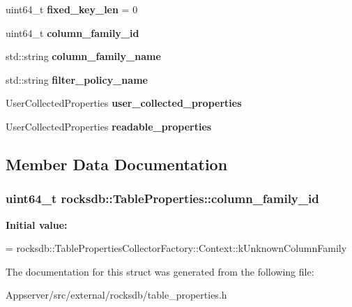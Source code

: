 \begin{DoxyCompactItemize}
\item 
uint64\+\_\+t {\bfseries fixed\+\_\+key\+\_\+len} = 0\hypertarget{structrocksdb_1_1TableProperties_a89dd7cb7e24a68b610d594355db1e2ff}{}\label{structrocksdb_1_1TableProperties_a89dd7cb7e24a68b610d594355db1e2ff}

\item 
uint64\+\_\+t {\bfseries column\+\_\+family\+\_\+id}
\item 
std\+::string {\bfseries column\+\_\+family\+\_\+name}\hypertarget{structrocksdb_1_1TableProperties_a7205e28a5b059e8919c2f342ec0718f6}{}\label{structrocksdb_1_1TableProperties_a7205e28a5b059e8919c2f342ec0718f6}

\item 
std\+::string {\bfseries filter\+\_\+policy\+\_\+name}\hypertarget{structrocksdb_1_1TableProperties_a126ce72e5ccd2de56684e4993c24f959}{}\label{structrocksdb_1_1TableProperties_a126ce72e5ccd2de56684e4993c24f959}

\item 
User\+Collected\+Properties {\bfseries user\+\_\+collected\+\_\+properties}\hypertarget{structrocksdb_1_1TableProperties_a91b4581d8bd7f9ee2a2adf1fba775a54}{}\label{structrocksdb_1_1TableProperties_a91b4581d8bd7f9ee2a2adf1fba775a54}

\item 
User\+Collected\+Properties {\bfseries readable\+\_\+properties}\hypertarget{structrocksdb_1_1TableProperties_acc3d8a0af78f830ddcd472dce0a327f6}{}\label{structrocksdb_1_1TableProperties_acc3d8a0af78f830ddcd472dce0a327f6}

\end{DoxyCompactItemize}


\subsection{Member Data Documentation}
\subsubsection[{\texorpdfstring{column\+\_\+family\+\_\+id}{column\_family\_id}}]{\setlength{\rightskip}{0pt plus 5cm}uint64\+\_\+t rocksdb\+::\+Table\+Properties\+::column\+\_\+family\+\_\+id}\hypertarget{structrocksdb_1_1TableProperties_a9046d2fe3f1eab7dbefe9b011b5b0c09}{}\label{structrocksdb_1_1TableProperties_a9046d2fe3f1eab7dbefe9b011b5b0c09}
{\bfseries Initial value\+:}
\begin{DoxyCode}
=
      rocksdb::TablePropertiesCollectorFactory::Context::kUnknownColumnFamily
\end{DoxyCode}


The documentation for this struct was generated from the following file\+:\begin{DoxyCompactItemize}
\item 
Appserver/src/external/rocksdb/table\+\_\+properties.\+h\end{DoxyCompactItemize}
